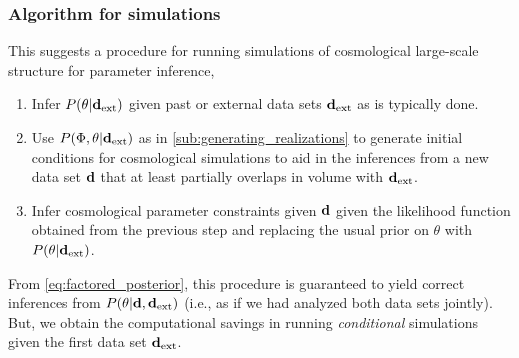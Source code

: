 \documentclass[11pt, letterpaper]{article}
\begin{document}
\subsubsection{Algorithm for simulations}

This suggests a procedure for running simulations of cosmological large-scale structure for
parameter inference,
\begin{enumerate}
	\item Infer $P(\theta | \mathbf{d}_{\rm ext})$ given past or external data sets $\mathbf{d}_{\rm ext}$ as is typically done.
	\item Use $P(\Phi, \theta | \mathbf{d}_{\rm ext})$ as in \autoref{sub:generating_realizations} to generate
	initial conditions for cosmological simulations to aid in the inferences from a new
	data set $\mathbf{d}$ that at least partially overlaps in volume with $\mathbf{d}_{\rm ext}$.
	\item Infer cosmological parameter constraints given $\mathbf{d}$ given the likelihood function
	obtained from the previous step and replacing the usual prior on $\theta$ with $P(\theta | \mathbf{d}_{\rm ext})$.
\end{enumerate}
From \autoref{eq:factored_posterior}, this procedure is guaranteed to yield correct inferences
from $P(\theta | \mathbf{d}, \mathbf{d}_{\rm ext})$ (i.e., as if we had analyzed both data sets jointly).
But, we obtain the computational savings in running \emph{conditional} simulations given
the first data set $\mathbf{d}_{\rm ext}$.





\end{document}
